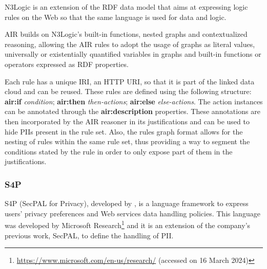 N3Logic is an extension of the RDF data model that aims at expressing logic rules on the Web so that the same language is used for data and logic.

AIR builds on N3Logic's built-in functions, nested graphs and contextualized reasoning, allowing the AIR rules to adopt the usage of graphs as literal values, universally or existentially quantified variables in graphs and built-in functions or operators expressed as RDF properties.

Each rule has a unique IRI, an HTTP URI, so that it is part of the linked data cloud and can be reused.
These rules are defined using the following structure: \textbf{air:if} \textit{condition}; \textbf{air:then} \textit{then-actions}; \textbf{air:else} \textit{else-actions}.
The action instances can be annotated through the \textbf{air:description} properties.
These annotations are then incorporated by the AIR reasoner in its justifications and can be used to hide PIIs present in the rule set.
Also, the rules graph format allows for the nesting of rules within the same rule set, thus providing a way to segment the conditions stated by the rule in order to only expose part of them in the justifications.

\subsubsection{S4P}
\label{sec:s4p}

S4P (SecPAL for Privacy), developed by \cite{becker_framework_2009, becker_s4p_2010}, is a language framework to express users' privacy preferences and Web services data handling policies.
This language was developed by Microsoft Research\footnote{\url{https://www.microsoft.com/en-us/research/} (accessed on 16 March 2024)} and it is an extension of the company's previous work, SecPAL, to define the handling of PII.

